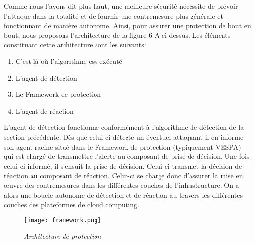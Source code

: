 Comme nous l’avons dit plus haut, une meilleure sécurité nécessite de  prévoir l’attaque dans la totalité et de fournir une contremesure plus générale et fonctionnant de manière  autonome.  Ainsi, pour assurer une protection de bout en bout, nous proposons l’architecture de la figure 6-A ci-dessus. Les éléments constituant cette architecture sont les suivants:
\begin{enumerate}
 \item C'est là où l'algorithme est exécuté
 \item L'agent de détection
 \item Le Framework de protection
 \item L'agent de réaction
\end{enumerate}
L’agent de détection fonctionne conformément à l'algorithme de détection de la section précédente.  Dès que  celui-ci détecte un éventuel attaquant il en informe son agent racine  situé dans le Framework de protection (typiquement VESPA) qui est chargé de  transmettre l’alerte au composant de prise de  décision.  Une fois celui-ci informé, il s’ensuit la prise de décision. Celui-ci transmet la décision de réaction au composant de réaction. Celui-ci se charge donc d’assurer la mise en œuvre des contremesures dans les différentes couches de l’infrastructure. On a alors une boucle autonome de détection et de réaction au travers les différentes couches des plateformes de cloud computing.

\begin{figure}[h!]
      \centering \texttt{[image: framework.png]}          
      \caption{\it Architecture de protection}    
\end{figure}  

    
  
      



    






